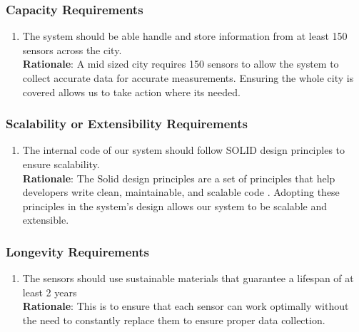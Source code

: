 \documentclass[]{article}
\begin{document}
\subsubsection{Capacity Requirements}
\label{ssub:capacity_requirements}
\begin{enumerate}[{PR-C}1. ]
	\item The system should be able handle and store information from at least 150 sensors across the city.\\
    \textbf{Rationale}: A mid sized city requires 150 sensors \cite{english2020} to allow the system to collect accurate data for accurate measurements. Ensuring the whole city is covered allows us to take action where its needed.
\end{enumerate}

\subsubsection{Scalability or Extensibility Requirements}
\label{ssub:scalability_or_extensibility_requirements}
\begin{enumerate}[{PR-SE}1. ]
	\item The internal code of our system should follow SOLID design principles to ensure scalability.\\ 
    \textbf{Rationale}: The Solid design principles are a set of principles that help developers write clean, maintainable, and scalable code \cite{gorai2024}. Adopting these principles in the system's design allows our system to be scalable and extensible. 
\end{enumerate}

\subsubsection{Longevity Requirements}
\label{ssub:longevity_requirements}
\begin{enumerate}[{PR-L}1. ]
	\item The sensors should use sustainable materials that guarantee a lifespan of at least 2 years\\
    \textbf{Rationale}: This is to ensure that each sensor can work optimally without the need to constantly replace them to ensure proper data collection.
\end{enumerate}

\end{document}
